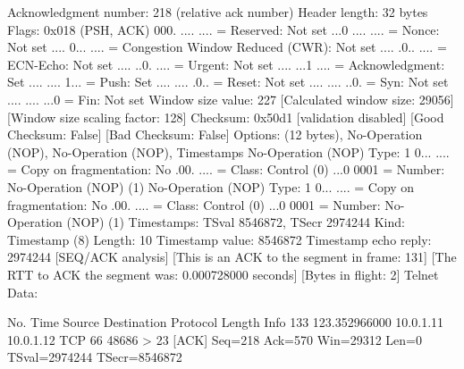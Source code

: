     Acknowledgment number: 218    (relative ack number)
    Header length: 32 bytes
    Flags: 0x018 (PSH, ACK)
        000. .... .... = Reserved: Not set
        ...0 .... .... = Nonce: Not set
        .... 0... .... = Congestion Window Reduced (CWR): Not set
        .... .0.. .... = ECN-Echo: Not set
        .... ..0. .... = Urgent: Not set
        .... ...1 .... = Acknowledgment: Set
        .... .... 1... = Push: Set
        .... .... .0.. = Reset: Not set
        .... .... ..0. = Syn: Not set
        .... .... ...0 = Fin: Not set
    Window size value: 227
    [Calculated window size: 29056]
    [Window size scaling factor: 128]
    Checksum: 0x50d1 [validation disabled]
        [Good Checksum: False]
        [Bad Checksum: False]
    Options: (12 bytes), No-Operation (NOP), No-Operation (NOP), Timestamps
        No-Operation (NOP)
            Type: 1
                0... .... = Copy on fragmentation: No
                .00. .... = Class: Control (0)
                ...0 0001 = Number: No-Operation (NOP) (1)
        No-Operation (NOP)
            Type: 1
                0... .... = Copy on fragmentation: No
                .00. .... = Class: Control (0)
                ...0 0001 = Number: No-Operation (NOP) (1)
        Timestamps: TSval 8546872, TSecr 2974244
            Kind: Timestamp (8)
            Length: 10
            Timestamp value: 8546872
            Timestamp echo reply: 2974244
    [SEQ/ACK analysis]
        [This is an ACK to the segment in frame: 131]
        [The RTT to ACK the segment was: 0.000728000 seconds]
        [Bytes in flight: 2]
Telnet
    Data: 

No.     Time           Source                Destination           Protocol Length Info
    133 123.352966000  10.0.1.11             10.0.1.12             TCP      66     48686 > 23 [ACK] Seq=218 Ack=570 Win=29312 Len=0 TSval=2974244 TSecr=8546872

